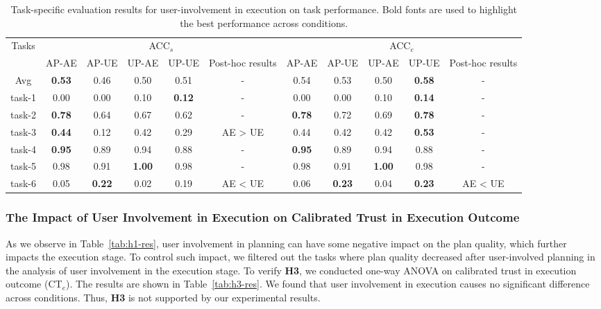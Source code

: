 \begin{table*}[h]
	\centering
	\caption{Task-specific evaluation results for user-involvement in execution on task performance. Bold fonts are used to highlight the best performance across conditions.}
	\label{tab:h4-res}
    \begin{small}
	\begin{tabular}{c | c c c  c | c | c  c c c | c}
	    \hline
        \multirow{2}{*}{Tasks}&     \multicolumn{5}{c|}{ACC$_s$}&  \multicolumn{5}{c}{ACC$_e$}\\
        \cline{2-11}
        & AP-AE& AP-UE& UP-AE& UP-UE& Post-hoc results& AP-AE& AP-UE& UP-AE& UP-UE& Post-hoc results\\
        \hline 
        \hline
        Avg& \textbf{0.53} & 0.46 & 0.50 & 0.51 & - & 0.54 & 0.53 & 0.50 & \textbf{0.58} & -\\
        \hline
        task-1& 0.00 & 0.00 & 0.10 & \textbf{0.12} & - & 0.00 & 0.00 & 0.10 & \textbf{0.14} & -\\
        task-2 &\textbf{0.78} & 0.64 & 0.67 & 0.62 & - & \textbf{0.78} & 0.72 & 0.69 & \textbf{0.78} & - \\
        task-3 & \textbf{0.44} & 0.12 & 0.42 & 0.29 & AE > UE & 0.44 & 0.42 & 0.42 & \textbf{0.53} & - \\
        task-4 & \textbf{0.95} & 0.89 & 0.94 & 0.88 & - & \textbf{0.95} & 0.89 & 0.94 & 0.88 & - \\
        task-5 & 0.98 & 0.91 & \textbf{1.00} & 0.98 & - & 0.98 & 0.91 & \textbf{1.00} & 0.98 & -\\
        task-6 & 0.05 & \textbf{0.22} & 0.02 & 0.19 & AE < UE & 0.06 & \textbf{0.23} & 0.04 & \textbf{0.23} & AE < UE\\
    \hline
	\end{tabular}
 \end{small}
\end{table*}

\subsubsection{The Impact of User Involvement in Execution on Calibrated Trust in Execution Outcome}
As we observe in Table~\ref{tab:h1-res}, user involvement in planning can have some negative impact on the plan quality, which further impacts the execution stage. 
To control such impact, we filtered out the tasks where plan quality decreased after user-involved planning in the analysis of user involvement in the execution stage. 
To verify \textbf{H3}, we conducted one-way ANOVA on calibrated trust in execution outcome (CT$_e$). The results are shown in Table~\ref{tab:h3-res}. 
We found that user involvement in execution causes no significant difference across conditions. 
Thus, \textbf{H3} is not supported by our experimental results.


